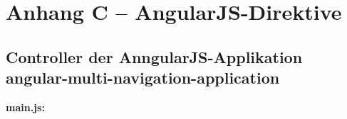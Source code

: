 \chapter*{Anhang C -- AngularJS-Direktive}\label{anhang-c---angularjs-web-component}

\section*{Controller der AnngularJS-Applikation angular-multi-navigation-application}\label{controller-der-angular-multi-navigation-application}

\textbf{main.js:}

\begin{Shaded}
\begin{Highlighting}[]
\OperatorTok{;}


\end{Highlighting}
\end{Shaded}
